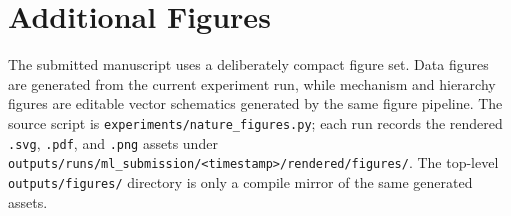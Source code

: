 \section{Additional Figures}
\label{app:additional-figures}

The submitted manuscript uses a deliberately compact figure set. Data figures
are generated from the current experiment run, while mechanism and hierarchy
figures are editable vector schematics generated by the same figure pipeline.
The source script is \texttt{experiments/nature\_figures.py}; each run records
the rendered \texttt{.svg}, \texttt{.pdf}, and \texttt{.png} assets under
\texttt{outputs/runs/ml\_submission/<timestamp>/rendered/figures/}. The
top-level \texttt{outputs/figures/} directory is only a compile mirror of the
same generated assets.

